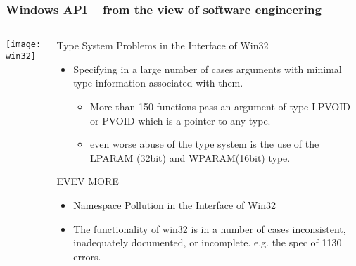 \begin{frame}[plain]
	\frametitle{Windows API -- from the view of software engineering}
	
	
	
	\begin{columns}
		
		\begin{column}{.4\textwidth}
			
			\texttt{[image: win32]}
			
		\end{column}
		
		\begin{column}{.6\textwidth}
			
			Type System Problems in the Interface of Win32
			
			\begin{itemize}
				\item Specifying in a large number
				of cases arguments with minimal type information associated with them. 
				\begin{itemize}	
					\item More than 150 functions pass an argument of type LPVOID or PVOID which is a 	pointer to any type.
					
					\item  even worse abuse of the type system is the use of the LPARAM (32bit) and WPARAM(16bit) type.
				\end{itemize}
			\end{itemize}
		
		EVEV MORE
		\begin{itemize}
		\item Namespace Pollution in the Interface of Win32
		
		\item The functionality of win32 is in a number of cases inconsistent, inadequately documented, or incomplete.  e.g. the spec of 1130 errors.
		\end{itemize}
		\end{column}		
	\end{columns}
	
	
\end{frame}

